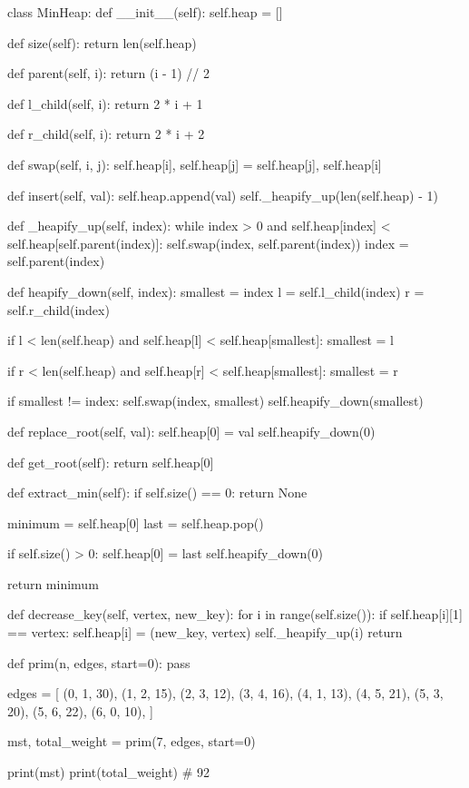 class MinHeap:
    def __init__(self):
        self.heap = []

    def size(self):
        return len(self.heap)

    def parent(self, i):
        return (i - 1) // 2

    def l_child(self, i):
        return 2 * i + 1

    def r_child(self, i):
        return 2 * i + 2

    def swap(self, i, j):
        self.heap[i], self.heap[j] = self.heap[j], self.heap[i]

    def insert(self, val):
        self.heap.append(val)
        self._heapify_up(len(self.heap) - 1)

    def _heapify_up(self, index):
        while index > 0 and self.heap[index] < self.heap[self.parent(index)]:
            self.swap(index, self.parent(index))
            index = self.parent(index)

    def heapify_down(self, index):
        smallest = index
        l = self.l_child(index)
        r = self.r_child(index)

        if l < len(self.heap) and self.heap[l] < self.heap[smallest]:
            smallest = l

        if r < len(self.heap) and self.heap[r] < self.heap[smallest]:
            smallest = r

        if smallest != index:
            self.swap(index, smallest)
            self.heapify_down(smallest)

    def replace_root(self, val):
        self.heap[0] = val
        self.heapify_down(0)

    def get_root(self):
        return self.heap[0]

    def extract_min(self):
        if self.size() == 0:
            return None

        minimum = self.heap[0]
        last = self.heap.pop()

        if self.size() > 0:
            self.heap[0] = last
            self.heapify_down(0)

        return minimum

    def decrease_key(self, vertex, new_key):
        for i in range(self.size()):
            if self.heap[i][1] == vertex:
                self.heap[i] = (new_key, vertex)
                self._heapify_up(i)
                return


def prim(n, edges, start=0):
    pass


edges = [
    (0, 1, 30),
    (1, 2, 15),
    (2, 3, 12),
    (3, 4, 16),
    (4, 1, 13),
    (4, 5, 21),
    (5, 3, 20),
    (5, 6, 22),
    (6, 0, 10),
]

mst, total_weight = prim(7, edges, start=0)

print(mst)
print(total_weight)  # 92